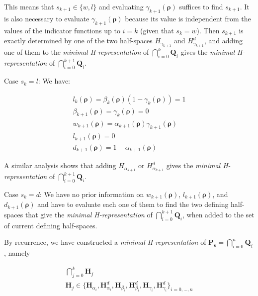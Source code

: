 \noindent This means that $s_{k+1}\in\{w,l\}$ and evaluating $\gamma_{k+1}(\boldsymbol\rho)$ suffices to find $s_{k+1}$. It is also necessary to evaluate $\gamma_{k+1}(\boldsymbol\rho)$ because its value is independent from the values of the indicator functions up to $i=k$ (given that $s_{k}=w$). Then $s_{k+1}$ is exactly determined by one of the two half-spaces $H_{\gamma_{k+1}}$ and $H^{d}_{\gamma_{k+1}}$, and adding one of them to the \textit{minimal H-representation} of $\bigcap_{i=0}^{k} \textbf{Q}_{i}$ gives the \textit{minimal H-representation} of $\bigcap_{i=0}^{k+1} \textbf{Q}_{i}$.

Case $s_{k}=l$: We have:

\begin{equation}
\begin{array}{l}
l_{k}(\boldsymbol\rho)=\beta_{k}(\boldsymbol\rho)(1-\gamma_{k}(\boldsymbol\rho))=1\\
\beta_{k+1}(\boldsymbol\rho)=\gamma_{k}(\boldsymbol\rho)=0\\
w_{k+1}(\boldsymbol\rho)=\alpha_{k+1}(\boldsymbol\rho)\gamma_{k+1}(\boldsymbol\rho)\\
l_{k+1}(\boldsymbol\rho)=0\\
d_{k+1}(\boldsymbol\rho)=1-\alpha_{k+1}(\boldsymbol\rho)
\end{array}
\end{equation}

\noindent A similar analysis shows that adding $H_{\alpha_{k+1}}$ or $H^{d}_{\alpha_{k+1}}$ gives the \textit{minimal H-representation} of $\bigcap_{i=0}^{k+1} \textbf{Q}_{i}$.

Case $s_{k}=d$: We have no prior information on $w_{k+1}(\boldsymbol\rho)$, $l_{k+1}(\boldsymbol\rho)$, and $d_{k+1}(\boldsymbol\rho)$ and have to evaluate each one of them to find the two defining half-spaces that give the \textit{minimal H-representation} of $\bigcap_{i=0}^{k+1} \textbf{Q}_{i}$, when added to the set of current defining half-spaces.

By recurrence, we have constructed a \textit{minimal H-representation} of $\textbf{P}_{\boldsymbol s}=\bigcap_{i=0}^{n} \textbf{Q}_{i}$, namely

\begin{equation}
\begin{array}{l}
\bigcap_{j=0}^{k} \textbf{H}_{j}\\
\textbf{H}_{j}\in \{\textbf{H}_{\alpha_{i}}, \textbf{H}^{d}_{\alpha_{i}}, \textbf{H}_{\beta_{i}}, \textbf{H}^{d}_{\beta_{i}}, \textbf{H}_{\gamma_{i}}, \textbf{H}^{d}_{\gamma_{i}}\}_{i=0,...,n}
\end{array}
\label{eq:minRepresentation}
\end{equation}

